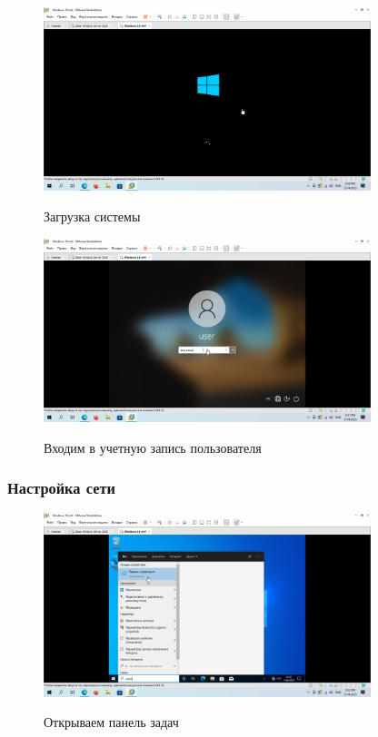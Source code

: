 \documentclass[a4paper]{article}
\begin{document}
  \begin{figure}[H]
    \centering
    \includegraphics[width=0.85\textwidth]{5_0058}
    \label{img:58}
    \caption{Загрузка системы}
  \end{figure}

  \begin{figure}[H]
    \centering
    \includegraphics[width=0.85\textwidth]{5_0059}
    \label{img:59}
    \caption{Входим в учетную запись пользователя}
  \end{figure}

  \subsubsection{Настройка сети}

  \begin{figure}[H]
    \centering
    \includegraphics[width=0.85\textwidth]{5_0060}
    \label{img:60}
    \caption{Открываем панель задач}
  \end{figure}
\end{document}
